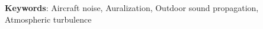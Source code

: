 %
%
%
%
%
%

%

\vspace{0.1cm}

\textbf{Keywords}: Aircraft noise, Auralization, Outdoor sound propagation, Atmospheric turbulence
